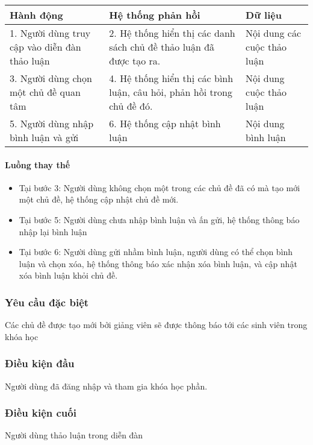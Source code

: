 \documentclass[./../main_file.tex]{subfiles}
\begin{document}
\begin{table}[H]
				\begin{tabular}{|p{.33\textwidth}|p{}|p{}|}
		\hline
		\textbf{Hành động}                  & \textbf{Hệ thống phản hồi}     & \textbf{Dữ liệu}   \\ \hline
		1. Người dùng truy cập vào diễn đàn thảo luận & 2. Hệ thống hiển thị các danh sách chủ đề thảo luận đã được tạo ra.    & Nội dung các cuộc thảo luận \\ \hline
		3. Người dùng chọn một chủ đề quan tâm        & 4. Hệ thống hiển thị các bình luận, câu hỏi, phản hồi trong chủ đề đó. & Nội dung cuộc thảo luận     \\ \hline
		5. Người dùng nhập bình luận và gửi & 6. Hệ thống cập nhật bình luận & Nội dung bình luận \\ \hline
	\end{tabular}
\end{table}

\paragraph{Luồng thay thế}
\begin{itemize}
	\item Tại bước 3: Người dùng không chọn một trong các chủ đề đã có mà tạo mới một chủ đề, hệ thống cập nhật chủ đề mới.
	\item Tại bước 5: Người dùng chưa nhập bình luận và ấn gửi, hệ thống thông báo nhập lại bình luận
	\item Tại bước 6: Người dùng gửi nhầm bình luận, người dùng có thể chọn bình luận và chọn xóa, hệ thống thông báo xác nhận xóa bình luận, và cập nhật xóa bình luận khỏi chủ đề.
	
\end{itemize}
\subsubsection{Yêu cầu đặc biệt}
Các chủ đề được tạo mới bởi giảng viên sẽ được thông báo tới các sinh viên trong khóa học

\subsubsection{Điều kiện đầu}
Người dùng đã đăng nhập và tham gia khóa học phần.

\subsubsection{Điều kiện cuối}
Người dùng thảo luận trong diễn đàn
\end{document}
